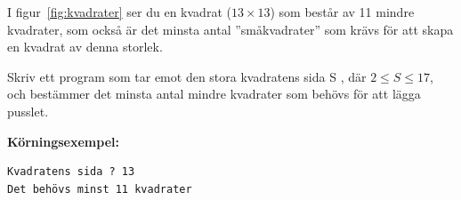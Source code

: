 \documentclass[a4paper,12pt]{article}
\newcounter{iii}\setcounter{iii}{0}
\newcounter{pun}[iii]
\begin{document}
I figur~\ref{fig:kvadrater} ser du en kvadrat ($13\times13$) som består av 11 mindre kvadrater, som också är det minsta antal ''småkvadrater'' som krävs för att skapa en kvadrat av denna storlek.

Skriv ett program som tar emot den stora kvadratens sida S , där $2 \le S \le 17$, och bestämmer det minsta antal mindre kvadrater som behövs för att lägga pusslet.

\textbf{Körningsexempel:}
\begin{lstlisting}
Kvadratens sida ? 13 
Det behövs minst 11 kvadrater
\end{lstlisting}

\end{document}
